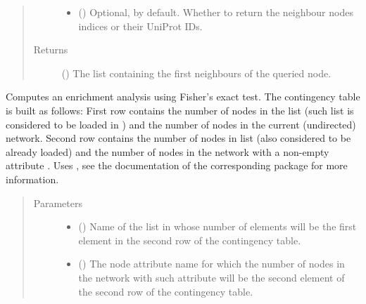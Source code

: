 \documentclass[letterpaper,10pt,english]{sphinxmanual}
\begin{document}
\begin{fulllineitems}
\begin{fulllineitems}
\begin{quote}
\begin{description}
\begin{itemize}
\item {} 
 () \textendash{} Optional,  by default. Whether to return the
neighbour nodes indices or their UniProt IDs.

\end{itemize}

\item[{Returns}] \leavevmode
() \textendash{} The list containing the first neighbours of the
queried node.

\end{description}\end{quote}

\end{fulllineitems}


\begin{fulllineitems}
\label{\detokenize{main:pypath.main.PyPath.fisher_enrichment}}
Computes an enrichment analysis using Fisher’s exact test. The
contingency table is built as follows:
First row contains the number of nodes in the  list (such
list is considered to be loaded in
) and the number of nodes in
the current (undirected) network. Second row contains the number
of nodes in  list (also considered to be already loaded)
and the number of nodes in the network with a non-empty
attribute . Uses , see
the documentation of the corresponding package for more
information.
\begin{quote}\begin{description}
\item[{Parameters}] \leavevmode\begin{itemize}
\item {} 
 () \textendash{} Name of the list in 
whose number of elements will be the first element in the
second row of the contingency table.

\item {} 
 () \textendash{} The node attribute name for which the number of nodes in the
network with such attribute will be the second element of
the second row of the contingency table.


\end{itemize}
\end{description}
\end{quote}
\end{fulllineitems}
\end{fulllineitems}
\end{document}
